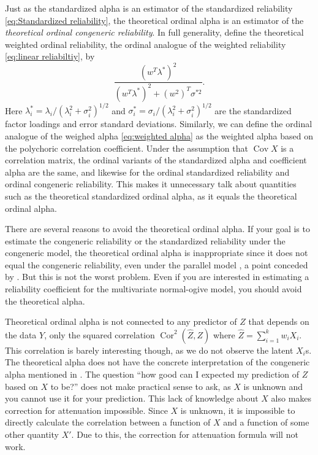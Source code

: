 \documentclass[twoside]{article}
\DeclareMathOperator{\Cor}{Cor}
\DeclareMathOperator{\Cov}{Cov}
\renewcommand{\sqrt}[1]{{(#1)^{1/2}}}
\begin{document}
Just as the standardized alpha is an estimator of the standardized reliability \cref{eq:Standardized reliability}, the theoretical ordinal alpha is an estimator of the \textit{theoretical ordinal congeneric reliability}. In full generality, define the theoretical weighted ordinal reliability, the ordinal analogue of the weighted reliability \eqref{eq:linear reliabiltiy}, by
\begin{equation}
\frac{(w^T\lambda^*)^2}{(w^T\lambda^*)^2 + (w^2)^T\sigma^{*2}}.
\end{equation}
Here $\lambda_i^* = \lambda_i/\sqrt{\lambda_i^2 + \sigma_i^2}$ and $\sigma_i^* = \sigma_i/\sqrt{\lambda_i^2 + \sigma_i^2}$ are the standardized factor loadings and error standard deviations. Similarly, we can define the ordinal analogue of the weighed alpha \eqref{eq:weighted alpha} as the weighted alpha based on the polychoric correlation coefficient. Under the assumption that $\Cov X$ is a correlation matrix, the ordinal variants of the standardized alpha and coefficient alpha are the same, and likewise for the ordinal standardized reliability and ordinal congeneric reliability. This makes it unnecessary talk about quantities such as the theoretical standardized ordinal alpha, as it equals the theoretical ordinal alpha. 

There are several reasons to avoid the theoretical ordinal alpha. If your
goal is to estimate the congeneric reliability or the standardized
reliability under the congeneric model, the theoretical ordinal alpha is inappropriate since
it does not equal the congeneric reliability, even under the parallel
model \citep[p. 1062, "Misconception 2"]{Chalmers2018-fj}, a point
conceded by \citet{Zumbo2019-lm}. But this is not the worst problem.
Even if you are interested in estimating a reliability coefficient
for the multivariate normal-ogive model, you should avoid the theoretical
alpha.

Theoretical ordinal alpha is not connected to any predictor
of $Z$ that depends on the data $Y$, only the squared correlation $\Cor^{2}(\hat{Z},Z)$ where $\hat{Z}=\sum_{i=1}^k w_iX_i$. This correlation is barely interesting though, as we do not observe
the latent $X_{i}$s. The theoretical alpha does not have the concrete
interpretation of the congeneric alpha mentioned in . The question
``how good can I expected my prediction of $Z$ based on $X$ to
be?'' does not make practical sense to ask, as $X$ is unknown and you cannot use it for your prediction. This
lack of knowledge about $X$ also makes correction for attenuation
impossible. Since $X$ is unknown, it is impossible to directly calculate
the correlation between a function of $X$ and a function of some
other quantity $X'$. Due to this, the correction for attenuation formula
will not work. 
\end{document}
